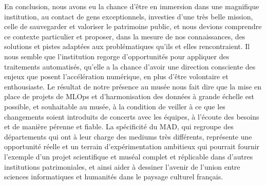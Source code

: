 En conclusion, nous avons eu la chance d'être en immersion dans une magnifique institution, au contact de gens exceptionnels, investi\wokisme e\wokisme s d'une très belle mission, celle de sauvegarder et valoriser le patrimoine public, et nous devions comprendre ce contexte particulier et proposer, dans la mesure de nos connaissances, des solutions et pistes adaptées aux problématiques qu'ils et elles rencontraient. Il nous semble que l'institution regorge d'opportunités pour appliquer des traitements automatisés, qu'elle a la chance d'avoir une direction consciente des enjeux que posent l'accélération numérique, en plus d'être volontaire et enthousiaste. Le résultat de notre présence au musée nous fait dire que la mise en place de projets de MLOps et d'harmonisation des données à grande échelle est possible, et souhaitable au musée, à la condition de veiller à ce que les changements soient introduits de concerts avec les équipes, à l'écoute des besoins et de manière pérenne et fiable. La spécificité du MAD, qui regroupe des départements qui ont à leur charge des mediums très différents, représente une opportunité réelle et un terrain d'expérimentation ambitieux qui pourrait fournir l'exemple d'un projet scientifique et muséal complet et réplicable dans d'autres institutions patrimoniales, et ainsi aider à dessiner l'avenir de l'union entre sciences informatiques et humanités dans le paysage culturel français.

\newpage{\pagestyle{empty}\cleardoublepage}	